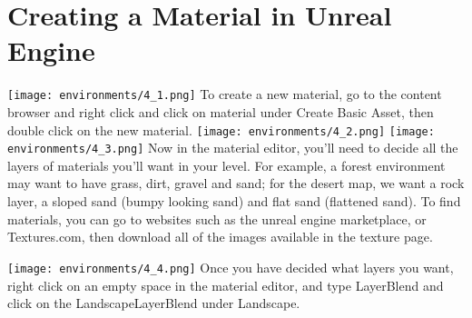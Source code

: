 \documentclass[../main.tex]{subfiles}
\begin{document}
\section {Creating a Material in Unreal Engine}
\texttt{[image: environments/4\_1.png]}
To create a new material, go to the content browser and right click and click on material under Create Basic Asset, then double click on the new material.
\texttt{[image: environments/4\_2.png]}
\texttt{[image: environments/4\_3.png]}
Now in the material editor, you’ll need to decide all the layers of materials you’ll want in your level. For example, a forest environment may want to have grass, dirt, gravel and sand; for the desert map, we want a rock layer, a sloped sand (bumpy looking sand) and flat sand (flattened sand).
To find materials, you can go to websites such as the unreal engine marketplace, or Textures.com, then download all of the images available in the texture page.

\texttt{[image: environments/4\_4.png]}
Once you have decided what layers you want, right click on an empty space in the material editor, and type LayerBlend and click on the LandscapeLayerBlend under Landscape.
\end{document}

